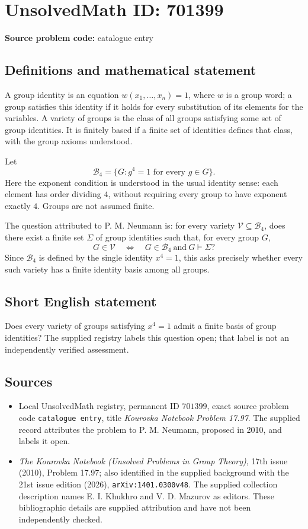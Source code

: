 \documentclass[11pt]{article}
\begin{document}
\section*{UnsolvedMath ID: 701399}
\textbf{Source problem code:} catalogue entry
\subsection{Definitions and mathematical statement}
A group identity is an equation \(w(x_1,\ldots,x_n)=1\), where \(w\) is a group word; a group satisfies this identity if it holds for every substitution of its elements for the variables. A variety of groups is the class of all groups satisfying some set of group identities. It is finitely based if a finite set of identities defines that class, with the group axioms understood.

Let
\[
\mathcal B_4=\{G: g^4=1\text{ for every }g\in G\}.
\]
Here the exponent condition is understood in the usual identity sense: each element has order dividing \(4\), without requiring every group to have exponent exactly \(4\). Groups are not assumed finite.

The question attributed to P. M. Neumann is: for every variety \(\mathcal V\subseteq\mathcal B_4\), does there exist a finite set \(\Sigma\) of group identities such that, for every group \(G\),
\[
G\in\mathcal V
\quad\Longleftrightarrow\quad
G\in\mathcal B_4\ \text{and}\ G\models\Sigma?
\]
Since \(\mathcal B_4\) is defined by the single identity \(x^4=1\), this asks precisely whether every such variety has a finite identity basis among all groups.
\subsection{Short English statement}
Does every variety of groups satisfying \(x^4=1\) admit a finite basis of group identities? The supplied registry labels this question open; that label is not an independently verified assessment.
\subsection{Sources}
\begin{itemize}
\item Local UnsolvedMath registry, permanent ID \(701399\), exact source problem code \texttt{catalogue entry}, title \emph{Kourovka Notebook Problem 17.97}. The supplied record attributes the problem to P. M. Neumann, proposed in 2010, and labels it open.
\item \emph{The Kourovka Notebook (Unsolved Problems in Group Theory)}, 17th issue (2010), Problem 17.97; also identified in the supplied background with the 21st issue edition (2026), \texttt{arXiv:1401.0300v48}. The supplied collection description names E. I. Khukhro and V. D. Mazurov as editors. These bibliographic details are supplied attribution and have not been independently checked.
\end{itemize}
\end{document}
